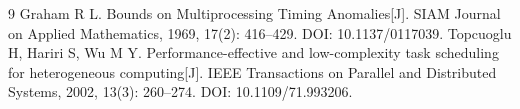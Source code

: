 \documentclass[UTF8,a4paper,zihao=-4]{ctexart}
\numberwithin{equation}{section}
\numberwithin{figure}{section}
\numberwithin{table}{section}
\begin{document}
\setcounter{section}{5}

\clearpage

\begin{thebibliography}{9}
 Graham R L. Bounds on Multiprocessing Timing Anomalies[J]. SIAM Journal on Applied Mathematics, 1969, 17(2): 416--429. DOI: 10.1137/0117039.
 Topcuoglu H, Hariri S, Wu M Y. Performance-effective and low-complexity task scheduling for heterogeneous computing[J]. IEEE Transactions on Parallel and Distributed Systems, 2002, 13(3): 260--274. DOI: 10.1109/71.993206.
\end{thebibliography}
\end{document}
